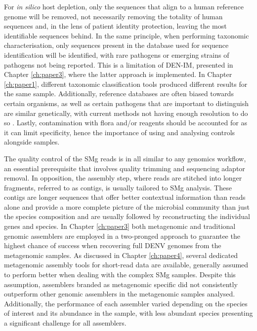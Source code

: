 For \textit{in silico} host depletion, only the sequences that align to a human reference genome will be removed, not necessarily removing the totality of human sequences and, in the lens of patient identity protection, leaving the most identifiable sequences behind. In the same principle, when performing taxonomic characterisation, only sequences present in the database used for sequence identification will be identified, with rare pathogens or emerging strains of pathogens not being reported. This is a limitation of DEN-IM, presented in Chapter \ref{ch:paper3}, where the latter approach is implemented. In Chapter \ref{ch:paper1}, different taxonomic classification tools produced different results for the same sample. Additionally, reference databases are often biased towards certain organisms, as well as certain pathogens that are important to distinguish are similar genetically, with current methods not having enough resolution to do so \citep{gu_clinical_2019}. Lastly, contamination with flora and/or reagents should be accounted for as it can limit specificity, hence the importance of using and analysing controls alongside samples. 

The quality control of the \ac{SMg} reads is in all similar to any genomics workflow, an essential prerequisite that involves quality trimming and sequencing adaptor removal. In opposition, the assembly step, where reads are stitched into longer fragments, referred to as contigs, is usually tailored to \ac{SMg} analysis. These contigs are longer sequences that offer better contextual information than reads alone and provide a more complete picture of the microbial community than just the species composition and are usually followed by reconstructing the individual genes and species. In Chapter \ref{ch:paper3} both metagenomic and traditional genomic assemblers are employed in a two-pronged approach to guarantee the highest chance of success when recovering full \ac{DENV} genomes from the metagenomic samples. As discussed in Chapter \ref{ch:paper4}, several dedicated metagenomic assembly tools for short-read data are available, generally assumed to perform better when dealing with the complex \ac{SMg} samples. Despite this assumption, assemblers branded as metagenomic specific did not consistently outperform other genomic assemblers in the metagenomic samples analysed. Additionally, the performance of each assembler varied depending on the species of interest and its abundance in the sample, with less abundant species presenting a significant challenge for all assemblers.

